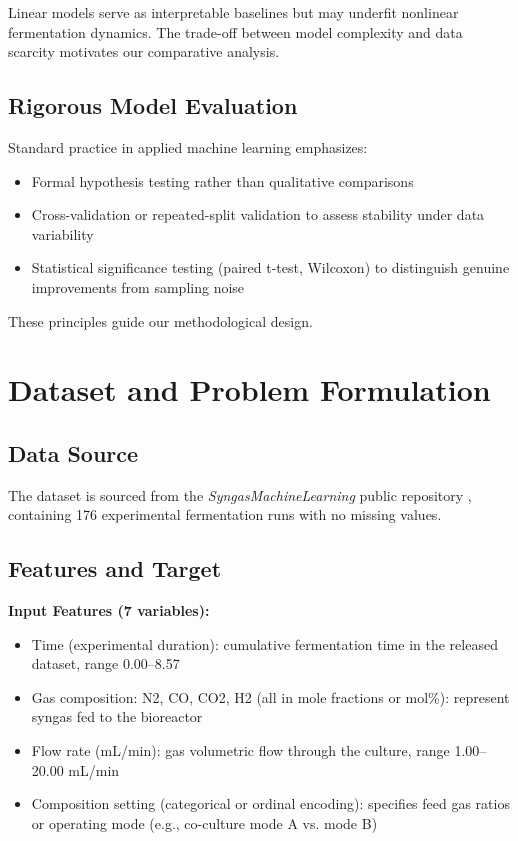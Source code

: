 \documentclass[conference]{IEEEtran}
\begin{document}
Linear models serve as interpretable baselines but may underfit nonlinear fermentation dynamics. The trade-off between model complexity and data scarcity motivates our comparative analysis.

\subsection{Rigorous Model Evaluation}
Standard practice in applied machine learning emphasizes:
\begin{itemize}
\item Formal hypothesis testing rather than qualitative comparisons \cite{breiman2001}
\item Cross-validation or repeated-split validation to assess stability under data variability
\item Statistical significance testing (paired t-test, Wilcoxon) to distinguish genuine improvements from sampling noise
\end{itemize}

These principles guide our methodological design.

\section{Dataset and Problem Formulation}

\subsection{Data Source}
The dataset is sourced from the \textit{SyngasMachineLearning} public repository \cite{syngasrepo}, containing 176 experimental fermentation runs with no missing values.

\subsection{Features and Target}
\textbf{Input Features (7 variables):}
\begin{itemize}
\item Time (experimental duration): cumulative fermentation time in the released dataset, range 0.00--8.57
\item Gas composition: N2, CO, CO2, H2 (all in mole fractions or mol\%): represent syngas fed to the bioreactor
\item Flow rate (mL/min): gas volumetric flow through the culture, range 1.00--20.00 mL/min
\item Composition setting (categorical or ordinal encoding): specifies feed gas ratios or operating mode (e.g., co-culture mode A vs. mode B)
\end{itemize}
\end{document}
